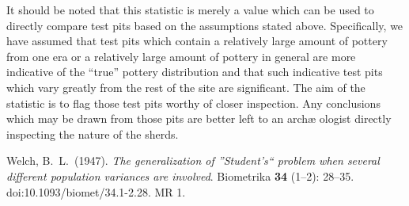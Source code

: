 \documentclass[conference]{IEEEtran}
\begin{document}
It should be noted that this statistic is merely a value which can be used to
directly compare test pits based on the assumptions stated above. Specifically,
we have assumed that test pits which contain a relatively large amount of
pottery from one era or a relatively large amount of pottery in general are more
indicative of the ``true'' pottery distribution and that such indicative test
pits which vary greatly from the rest of the site are significant. The aim of
the statistic is to flag those test pits worthy of closer inspection. Any
conclusions which may be drawn from those pits are better left to an arch\ae
ologist directly inspecting the nature of the sherds.

\begin{thebibliography}{1}
    Welch, B.~L.~(1947). \emph{The generalization of ''Student's`` problem when
    several different population variances are involved}. Biometrika \textbf{34} (1–2):
    28–35. doi:10.1093/biomet/34.1-2.28. MR 1.
\end{thebibliography}
\end{document}
